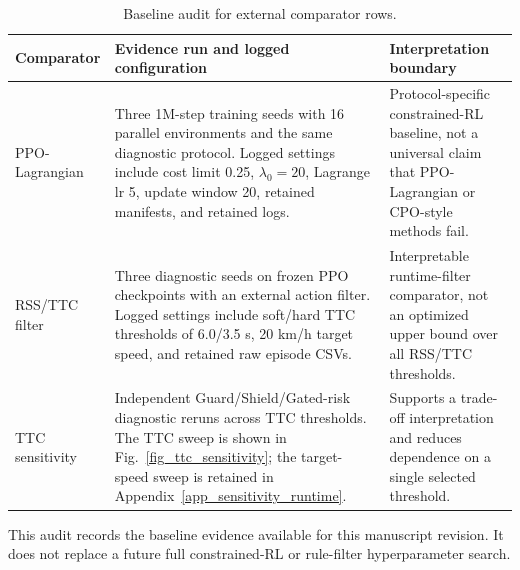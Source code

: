 \begin{table}[!htbp]
\centering
\caption{Baseline audit for external comparator rows.}
\label{tab_baseline_tuning_audit}
\footnotesize
\setlength{\tabcolsep}{4.0pt}
\renewcommand{\arraystretch}{1.12}
\begin{tabularx}{\textwidth}{@{}>{\raggedright\arraybackslash}p{}>{\raggedright\arraybackslash}X>{\raggedright\arraybackslash}p{}@{}}
\toprule
Comparator & Evidence run and logged configuration & Interpretation boundary \\
\midrule
PPO-Lagrangian &
Three 1M-step training seeds with 16 parallel environments and the same diagnostic protocol. Logged settings include cost limit 0.25, $\lambda_0=20$, Lagrange lr 5, update window 20, retained manifests, and retained logs. &
Protocol-specific constrained-RL baseline, not a universal claim that PPO-Lagrangian or CPO-style methods fail. \\
\addlinespace[2pt]
RSS/TTC filter &
Three diagnostic seeds on frozen PPO checkpoints with an external action filter. Logged settings include soft/hard TTC thresholds of 6.0/3.5 s, 20 km/h target speed, and retained raw episode CSVs. &
Interpretable runtime-filter comparator, not an optimized upper bound over all RSS/TTC thresholds. \\
\addlinespace[2pt]
TTC sensitivity &
Independent Guard/Shield/Gated-risk diagnostic reruns across TTC thresholds. The TTC sweep is shown in Fig.~\ref{fig_ttc_sensitivity}; the target-speed sweep is retained in Appendix~\ref{app_sensitivity_runtime}. &
Supports a trade-off interpretation and reduces dependence on a single selected threshold. \\
\bottomrule
\end{tabularx}
\begin{tablenotes}
\item This audit records the baseline evidence available for this manuscript revision. It does not replace a future full constrained-RL or rule-filter hyperparameter search.
\end{tablenotes}
\end{table}
